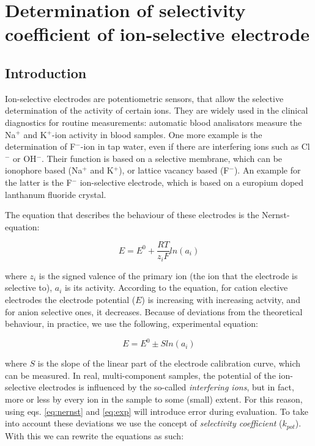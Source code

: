 \section{Determination of selectivity coefficient of ion-selective electrode}
\subsection{Introduction}

Ion-selective electrodes are potentiometric sensors, that allow the selective determination of the activity of certain ions.
They are widely used in the clinical diagnostics for routine measurements: automatic blood analisators measure the Na$^+$ and K$^+$-ion activity in blood samples. One more example is the determination of F$^-$-ion in tap water, even if there are interfering ions such as Cl$^-$ or OH$^-$. Their function is based on a selective membrane, which can be ionophore based (Na$^+$ and K$^+$), or lattice vacancy based (F$^-$). An example for the latter is the F$^-$ ion-selective electrode, which is based on a europium doped lanthanum fluoride crystal.

The equation that describes the behaviour of these electrodes is the Nernst-equation:

\begin{equation}
\label{eq:nernst}
	E
	=
	E^0
	+\frac{RT}{z_i F}
	ln(a_i)
\end{equation}

where $z_i$ is the signed valence of the primary ion (the ion that the electrode is selective to), $a_i$ is its activity.
According to the equation, for cation elective electrodes the electrode potential ($E$) is increasing with increasing actvity, and for anion selective ones, it decreases.
Because of deviations from the theoretical behaviour, in practice, we use the following, experimental equation:

\begin{equation}
\label{eq:exp}
	E
	=
	E^0
	\pm S ln(a_i)
\end{equation}

where $S$ is the slope of the linear part of the electrode calibration curve, which can be measured.
In real, multi-component samples, the potential of the ion-selective electrodes is influenced by the so-called \emph{interfering ions}, but in fact, more or less by every ion in the sample to some (small) extent.
For this reason, using eqs. \ref{eq:nernst} and \ref{eq:exp} will introduce error during evaluation.
To take into account these deviations we use the concept of \emph{selectivity coefficient} ($k_{pot}$). With this we can rewrite the equations as such: 

